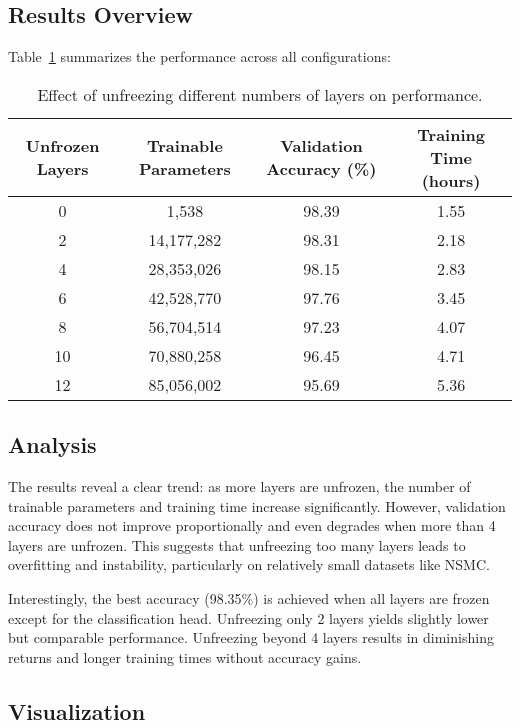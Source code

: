 \documentclass{article}
\begin{document}
\subsection{Results Overview}

Table~\ref{tab:results} summarizes the performance across all configurations:

\begin{table}[h]
  \caption{Effect of unfreezing different numbers of layers on performance.}
  \label{tab:results}
  \centering
  \begin{tabular}{cccc}
    \toprule
    Unfrozen Layers & Trainable Parameters & Validation Accuracy (\%) & Training Time (hours) \\
    \midrule
    0  & 1,538      & 98.39   & 1.55  \\
    2  & 14,177,282 & 98.31   & 2.18  \\
    4  & 28,353,026 & 98.15   & 2.83  \\
    6  & 42,528,770 & 97.76   & 3.45  \\
    8  & 56,704,514 & 97.23   & 4.07  \\
    10 & 70,880,258 & 96.45   & 4.71  \\
    12 & 85,056,002 & 95.69   & 5.36  \\
    \bottomrule
  \end{tabular}
\end{table}


\subsection{Analysis}

The results reveal a clear trend: as more layers are unfrozen, the number of trainable parameters and training time increase significantly. However, validation accuracy does not improve proportionally and even degrades when more than 4 layers are unfrozen. This suggests that unfreezing too many layers leads to overfitting and instability, particularly on relatively small datasets like NSMC.

Interestingly, the best accuracy (98.35\%) is achieved when all layers are frozen except for the classification head. Unfreezing only 2 layers yields slightly lower but comparable performance. Unfreezing beyond 4 layers results in diminishing returns and longer training times without accuracy gains.

\subsection{Visualization}
\end{document}
